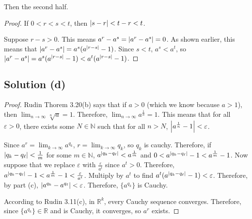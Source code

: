 \documentclass[11pt]{article}
\begin{document}
        Then the second half.
        \begin{proof}
            If $0 < r < s < t$, then $\left| s - r \right| < t - r < t$.
            
            Suppose $r - s > 0$.
            This means $a^r - a^s = \left| a^r - a^s \right| = 0$.
            As shown earlier, this means that $\left| a^r - a^s \right| = a^s(a^{\left| r - s \right|} - 1)$.
            Since $s < t$, $a^s < a^t$, so $\left| a^r - a^s \right| = a^s(a^{\left| r - s \right|} - 1) < a^t(a^{\left| r - s \right|} - 1)$.
        \end{proof}
    \subsection{Solution (d)}
        \begin{proof}
            Rudin Thorem 3.20(b) says that if $a > 0$ (which we know because $a > 1$), then $\lim_{n \to \infty} \sqrt[n]{a} = 1$.
            Therefore, $\lim_{n \to \infty} a^\frac{1}{n} = 1$.
            This means that for all $\varepsilon > 0$, there exists some $N \in \mathbb{N}$ such that for all $n > N$, $\left| a^\frac{1}{n} - 1 \right| < \varepsilon$.

            Since $a^r = \lim_{k \to \infty} a^{q_k}$, $r = \lim_{k \to \infty} q_k$, so $q_k$ is cauchy.
            Therefore, if $\left| q_k - q_\ell \right| < \frac{1}{m}$ for some $m \in \mathbb{N}$, $a^{\left| q_k - q_\ell \right|} < a^{\frac{1}{m}}$ and $0 < a^{\left| q_k - q_\ell \right|} - 1 < a^{\frac{1}{m}} - 1$.
            Now suppose that we replace $\varepsilon$ with $\frac{\varepsilon}{a^t}$ since $a^t > 0$.
            Therefore, $a^{\left| q_k - q_\ell \right|} - 1 < a^{\frac{1}{m}} - 1 < \frac{\varepsilon}{a^t}$.
            Multiply by $a^t$ to find $a^t(a^{\left| q_k - q_\ell \right|} - 1) < \varepsilon$.
            Therefore, by part (c), $\left| a^{q_k} - a^{q_\ell} \right| < \varepsilon$.
            Therefore, $\{a^{q_k}\}$ is Cauchy.

            According to Rudin 3.11(c), in $\mathbb{R}^k$, every Cauchy sequence converges.
            Therefore, since $\{a^{q_k}\} \in \mathbb{R}$ and is Cauchy, it converges, so $a^r$ exists.
        \end{proof}
\end{document}

